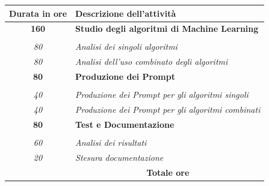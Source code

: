 

\begin{tabularx}{\textwidth}{|c|X|}
	\hline
	\textbf{Durata in ore} & \textbf{Descrizione dell'attività} \\\hline
	
	\textbf{160} & \textbf{Studio degli algoritmi di Machine Learning} \\ \hdashline  
    \multirow{3}{0cm}\\ 
    \textit{80} & 
    \textit{Analisi dei singoli algoritmi} \\
    \textit{80} & 
    \textit{Analisi dell'uso combinato degli algoritmi} \\
    \hline
    
    \textbf{80} & \textbf{Produzione dei Prompt} \\ \hdashline 
    \multirow{3}{0cm}\\ 
    \textit{40} & 
    \textit{Produzione dei Prompt per gli algoritmi singoli} \\
    \textit{40} & 
    \textit{Produzione dei Prompt per gli algoritmi combinati} \\
    \hline
    
    \textbf{80} & \textbf{Test e Documentazione}  \\ \hdashline 
    \multirow{4}{0cm}\\ 
    \textit{60} & 
    \textit{Analisi dei risultati} \\
    \textit{20} & 
    \textit{Stesura documentazione} \\
    \hline
	
	\textbf{\totaleOre} & \multicolumn{1}{|c|}{\textbf{Totale ore}} \\\hline
	
	
\end{tabularx}